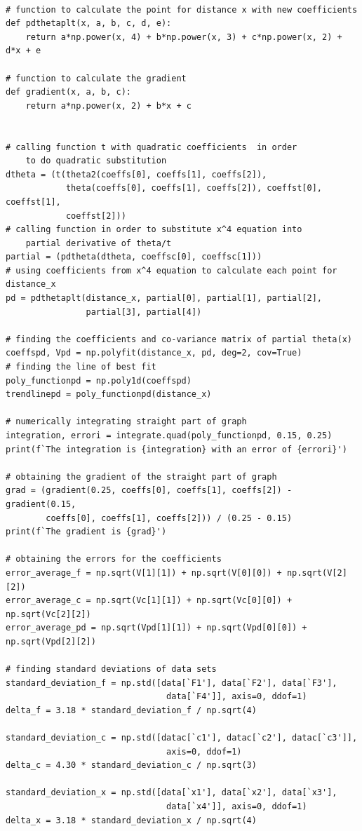 \documentclass[12pt, a4paper]{article}
\begin{document}
\begin{verbatim}
 
# function to calculate the point for distance x with new coefficients 
def pdthetaplt(x, a, b, c, d, e):
    return a*np.power(x, 4) + b*np.power(x, 3) + c*np.power(x, 2) + d*x + e
 
# function to calculate the gradient
def gradient(x, a, b, c):
    return a*np.power(x, 2) + b*x + c
 
 
# calling function t with quadratic coefficients  in order 
    to do quadratic substitution
dtheta = (t(theta2(coeffs[0], coeffs[1], coeffs[2]), 
            theta(coeffs[0], coeffs[1], coeffs[2]), coeffst[0], coeffst[1],
            coeffst[2]))
# calling function in order to substitute x^4 equation into 
    partial derivative of theta/t
partial = (pdtheta(dtheta, coeffsc[0], coeffsc[1]))
# using coefficients from x^4 equation to calculate each point for distance_x
pd = pdthetaplt(distance_x, partial[0], partial[1], partial[2], 
                partial[3], partial[4])
 
# finding the coefficients and co-variance matrix of partial theta(x)
coeffspd, Vpd = np.polyfit(distance_x, pd, deg=2, cov=True)
# finding the line of best fit
poly_functionpd = np.poly1d(coeffspd)
trendlinepd = poly_functionpd(distance_x)
 
# numerically integrating straight part of graph
integration, errori = integrate.quad(poly_functionpd, 0.15, 0.25)
print(f`The integration is {integration} with an error of {errori}')
 
# obtaining the gradient of the straight part of graph
grad = (gradient(0.25, coeffs[0], coeffs[1], coeffs[2]) - gradient(0.15, 
        coeffs[0], coeffs[1], coeffs[2])) / (0.25 - 0.15)
print(f`The gradient is {grad}')
 
# obtaining the errors for the coefficients
error_average_f = np.sqrt(V[1][1]) + np.sqrt(V[0][0]) + np.sqrt(V[2][2])
error_average_c = np.sqrt(Vc[1][1]) + np.sqrt(Vc[0][0]) + np.sqrt(Vc[2][2])
error_average_pd = np.sqrt(Vpd[1][1]) + np.sqrt(Vpd[0][0]) + np.sqrt(Vpd[2][2])
 
# finding standard deviations of data sets
standard_deviation_f = np.std([data[`F1'], data[`F2'], data[`F3'],
                                data[`F4']], axis=0, ddof=1)
delta_f = 3.18 * standard_deviation_f / np.sqrt(4)
 
standard_deviation_c = np.std([datac[`c1'], datac[`c2'], datac[`c3']],
                                axis=0, ddof=1)
delta_c = 4.30 * standard_deviation_c / np.sqrt(3)
 
standard_deviation_x = np.std([data[`x1'], data[`x2'], data[`x3'],
                                data[`x4']], axis=0, ddof=1)
delta_x = 3.18 * standard_deviation_x / np.sqrt(4)
 

\end{verbatim}
\end{document}

